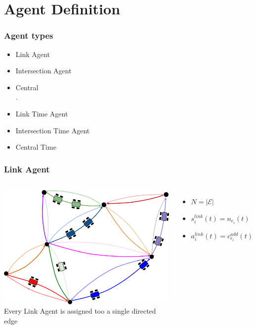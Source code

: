 \documentclass{beamer}
\begin{document}
	\section{Agent Definition}
	\begin{frame}
		\frametitle{Agent types}
		\begin{itemize}
			\item Link Agent
			\item Intersection Agent
			\item Central \\.


			\item Link Time Agent
			\item Intersection Time Agent
			\item Central Time
		\end{itemize}
	\end{frame}
	\begin{frame}
		\frametitle{Link Agent}
		\begin{columns}
			\includegraphics[width=\textwidth]{link.png}
			Every Link Agent is assigned too a single directed edge
			\begin{itemize}
				\item $N = |\mathcal{E}|$
				\item $s_i^{link}(t) = n_{e_i}(t)$
				\item $a_i^{link}(t) = c_{e_i}^{add}(t)$
			\end{itemize}
		\end{columns}
	\end{frame}
\end{document}
